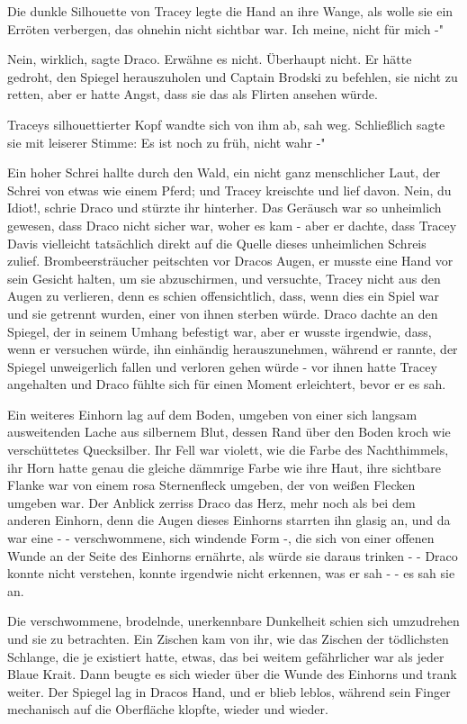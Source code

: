 Die dunkle Silhouette von Tracey legte die Hand an ihre Wange, als wolle sie ein
Erröten verbergen, das ohnehin nicht sichtbar war. \glqq{}Ich meine, nicht
für mich -"

\glqq{}Nein, wirklich\grqq{}, sagte Draco. \glqq{}Erwähne es nicht. Überhaupt
nicht.\grqq{} Er hätte gedroht, den Spiegel herauszuholen und Captain Brodski zu
befehlen, sie nicht zu retten, aber er hatte Angst, dass sie das als Flirten
ansehen würde.

Traceys silhouettierter Kopf wandte sich von ihm ab, sah weg. Schließlich sagte
sie mit leiserer Stimme: \glqq{}Es ist noch zu früh, nicht wahr -"

Ein hoher Schrei hallte durch den Wald, ein nicht ganz menschlicher Laut, der
Schrei von etwas wie einem Pferd; und Tracey kreischte und lief davon.
\glqq{}Nein, du Idiot!\grqq{}, schrie Draco und stürzte ihr hinterher. Das
Geräusch war so unheimlich gewesen, dass Draco nicht sicher war, woher es
kam - aber er dachte, dass Tracey Davis vielleicht tatsächlich direkt auf
die Quelle dieses unheimlichen Schreis zulief. Brombeersträucher
peitschten vor Dracos Augen, er musste eine Hand vor sein Gesicht halten,
um sie abzuschirmen, und versuchte, Tracey nicht aus den Augen zu
verlieren, denn es schien offensichtlich, dass, wenn dies ein Spiel war
und sie getrennt wurden, einer von ihnen sterben würde. Draco dachte an
den Spiegel, der in seinem Umhang befestigt war, aber er wusste
irgendwie, dass, wenn er versuchen würde, ihn einhändig herauszunehmen,
während er rannte, der Spiegel unweigerlich fallen und verloren gehen
würde - vor ihnen hatte Tracey angehalten und Draco fühlte sich für einen
Moment erleichtert, bevor er es sah.

Ein weiteres Einhorn lag auf dem Boden, umgeben von einer sich langsam
ausweitenden Lache aus silbernem Blut, dessen Rand über den Boden kroch
wie verschüttetes Quecksilber. Ihr Fell war violett, wie die Farbe des
Nachthimmels, ihr Horn hatte genau die gleiche dämmrige Farbe wie ihre
Haut, ihre sichtbare Flanke war von einem rosa Sternenfleck umgeben, der
von weißen Flecken umgeben war. Der Anblick zerriss Draco das Herz, mehr
noch als bei dem anderen Einhorn, denn die Augen dieses Einhorns starrten
ihn glasig an, und da war eine - - verschwommene, sich windende Form -,
die sich von einer offenen Wunde an der Seite des Einhorns ernährte, als
würde sie daraus trinken - - Draco konnte nicht verstehen, konnte
irgendwie nicht erkennen, was er sah - - es sah sie an.

Die verschwommene, brodelnde, unerkennbare Dunkelheit schien sich umzudrehen und
sie zu betrachten. Ein Zischen kam von ihr, wie das Zischen der
tödlichsten Schlange, die je existiert hatte, etwas, das bei weitem
gefährlicher war als jeder Blaue Krait. Dann beugte es sich wieder über
die Wunde des Einhorns und trank weiter. Der Spiegel lag in Dracos Hand,
und er blieb leblos, während sein Finger mechanisch auf die Oberfläche
klopfte, wieder und wieder.

